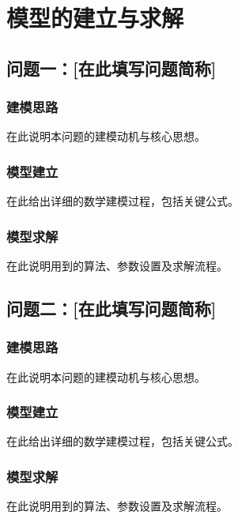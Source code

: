 \section{模型的建立与求解}


\subsection{问题一：[在此填写问题简称]}

\subsubsection{建模思路}
在此说明本问题的建模动机与核心思想。

\subsubsection{模型建立}
在此给出详细的数学建模过程，包括关键公式。

\subsubsection{模型求解}
在此说明用到的算法、参数设置及求解流程。


\subsection{问题二：[在此填写问题简称]}

\subsubsection{建模思路}
在此说明本问题的建模动机与核心思想。

\subsubsection{模型建立}
在此给出详细的数学建模过程，包括关键公式。

\subsubsection{模型求解}
在此说明用到的算法、参数设置及求解流程。

